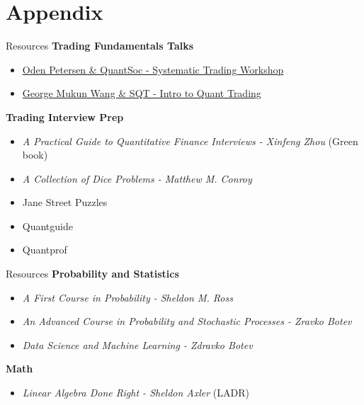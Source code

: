 \section{Appendix}

\begin{frame}{Resources}
  \textbf{Trading Fundamentals Talks}
  \begin{itemize}
    \item \href{https://www.youtube.com/watch?v=hYmR5qk4z8w}{Oden Petersen \& QuantSoc - Systematic Trading Workshop}
    \item \href{https://www.youtube.com/watch?v=2YkK4DnEBRE}{George Mukun Wang \& SQT - Intro to Quant Trading}
  \end{itemize}

  \textbf{Trading Interview Prep}
  \begin{itemize}
    \item \textit{A Practical Guide to Quantitative Finance Interviews - Xinfeng Zhou} (Green book)
    \item \textit{A Collection of Dice Problems - Matthew M. Conroy}
    \item Jane Street Puzzles
    \item Quantguide
    \item Quantprof
  \end{itemize}
\end{frame}

\begin{frame}{Resources}
  \textbf{Probability and Statistics}
  \begin{itemize}
    \item \textit{A First Course in Probability - Sheldon M. Ross}
    \item \textit{An Advanced Course in Probability and Stochastic Processes - Zravko Botev}
    \item \textit{Data Science and Machine Learning - Zdravko Botev}
  \end{itemize}

  \textbf{Math}
  \begin{itemize}
    \item \textit{Linear Algebra Done Right - Sheldon Axler} (LADR)
  \end{itemize}
\end{frame}

